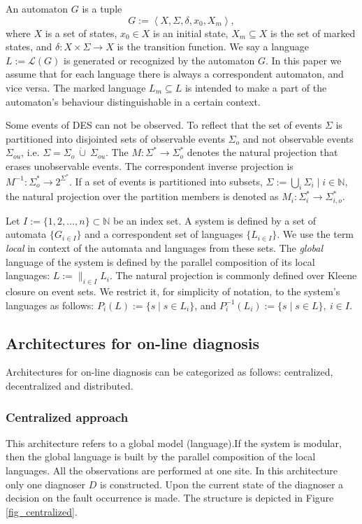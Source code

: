 \documentclass[letterpaper, 10pt, conference]{ieeeconf}
\begin{document}
An automaton $G$ is a tuple $$G := \left< X,\Sigma,\delta,x_0, X_m \right>,$$
where $X$ is a set of states, $x_0 \in X$ is an initial state, $X_m \subseteq X$
is the set of marked states, and $\delta: X \times \Sigma \rightarrow X$ is the
transition function.
We say a language $L := \mathcal{L}(G)$ is generated or recognized by the
automaton $G$. In this paper we assume that for each language there is always a
correspondent automaton, and vice versa. The marked language $L_m \subseteq L$
is intended to make a part of the automaton's behaviour distinguishable in a
certain context.

Some events of DES can not be observed. To reflect that the set of events
$\Sigma$ is partitioned into disjointed sets of observable events $\Sigma_o$ and
not observable events $\Sigma_{ou}$, i.e. $\Sigma = \Sigma_o~\dot{\cup}~
\Sigma_{ou}$.
The $M: \Sigma^* \rightarrow \Sigma_o^*$ denotes the natural projection that
erases unobservable events.
The correspondent inverse projection is $M^{-1}: \Sigma_o^* \rightarrow
2^{\Sigma^*}$.
If a set of events is partitioned into subsets, $\Sigma := \bigcup_i
\Sigma_{i} \mid i \in \mathbb{N}$, the natural projection over the partition
members is denoted as $M_i: \Sigma_i^* \rightarrow \Sigma_{i,o}^*$.

Let $I := \{1,2,\ldots,n\} \subset  \mathbb{N}$ be an index set. A system is
defined by a set of automata $\{G_{i \in I}\}$ and a correspondent set of
languages $\{L_{i \in I}\}$. We use the term \emph{local} in context of the
automata and languages from these sets. The \emph{global} language of the system
is defined by the parallel composition \cite{cassandras_introduction_2010} of
its local languages:
$L := \parallel_{i \in I} L_i$.
The natural projection is commonly defined over Kleene closure on event sets.
We restrict it, for simplicity of notation, to the system's languages as
follows: $P_i(L) := \{s\mid s\in L_{i}\}$, and $P_i^{-1}(L_{i}) := \{s \mid s
\in L\}, ~i \in I$.


\subsection{Architectures for on-line diagnosis}
Architectures for on-line diagnosis can be categorized as follows:
centralized, decentralized and distributed.

\subsubsection{Centralized approach}
This architecture refers to a global model (language).If the system is modular,
then the global language is built by the parallel composition of the local
languages. All the observations are performed at one site. In this architecture
only one diagnoser $D$ \cite{sampath_diagnosability_1995} is constructed. Upon
the current state of the diagnoser a decision on the fault occurrence is made.
The structure is depicted in Figure \ref{fig_centralized}.
\end{document}
